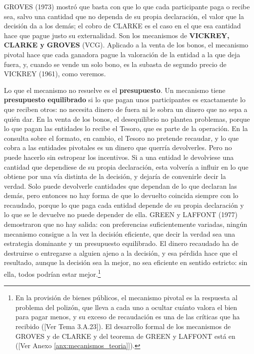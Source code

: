 \documentclass[10pt,a4paper]{article}
\newcommand{\authorfont}[1]{{\fontfamily{EBGaramond-TLF}\selectfont #1}}
\begin{document}
GROVES (1973) mostró que basta con que lo que cada participante paga o recibe sea, salvo una cantidad que no dependa de su propia declaración, el valor que la decisión da a los demás; el cobro de CLARKE es el caso en el que esa cantidad hace que pague justo su externalidad. Son los mecanismos de \textbf{VICKREY, CLARKE y GROVES} (VCG). Aplicado a la venta de los bonos, el mecanismo pivotal hace que cada ganadora pague la valoración de la entidad a la que deja fuera, y, cuando se vende un solo bono, es la subasta de segundo precio de VICKREY (1961), como veremos.

Lo que el mecanismo no resuelve es el \textbf{presupuesto}. Un mecanismo tiene \textbf{presupuesto equilibrado} si lo que pagan unos participantes es exactamente lo que reciben otros: no necesita dinero de fuera ni le sobra un dinero que no sepa a quién dar. En la venta de los bonos, el desequilibrio no plantea problemas, porque lo que pagan las entidades lo recibe el Tesoro, que es parte de la operación. En la consulta sobre el formato, en cambio, el Tesoro no pretende recaudar, y lo que cobra a las entidades pivotales es un dinero que querría devolverles. Pero no puede hacerlo sin estropear los incentivos. Si a una entidad le devolviese una cantidad que dependiese de su propia declaración, esta volvería a influir en lo que obtiene por una vía distinta de la decisión, y dejaría de convenirle decir la verdad. Solo puede devolverle cantidades que dependan de lo que declaran las demás, pero entonces no hay forma de que lo devuelto coincida siempre con lo recaudado, porque lo que paga cada entidad depende de su propia declaración y lo que se le devuelve no puede depender de ella. GREEN y LAFFONT (1977) demostraron que no hay salida: con preferencias suficientemente variadas, ningún mecanismo consigue a la vez la decisión eficiente, que decir la verdad sea una estrategia dominante y un presupuesto equilibrado. El dinero recaudado ha de destruirse o entregarse a alguien ajeno a la decisión, y esa pérdida hace que el resultado, aunque la decisión sea la mejor, no sea eficiente en sentido estricto: sin ella, todos podrían estar mejor.\footnote{%
  En la provisión de bienes públicos, el mecanismo pivotal es la respuesta al problema del polizón, que lleva a cada uno a ocultar cuánto valora el bien para pagar menos, y su exceso de recaudación es una de las críticas que ha recibido ([\authorfont{Ver Tema 3.A.23}]). El desarrollo formal de los mecanismos de GROVES y de CLARKE y del teorema de GREEN y LAFFONT está en ([\authorfont{Ver Anexo \ref{anx:mecanismos_teoria}}]).
}
\end{document}
